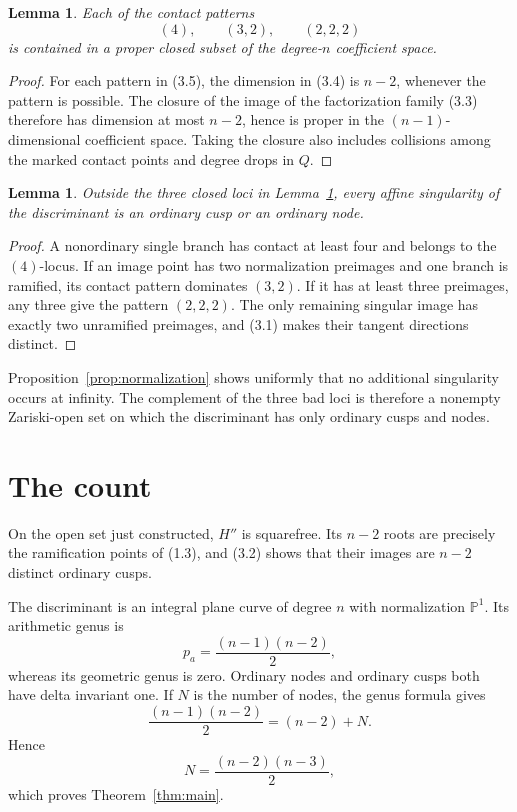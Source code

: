 \documentclass[11pt]{article}
\newtheorem{lemma}[theorem]{Lemma}
\newcommand{\Pone}{\mathbb P^1}
\begin{document}
\begin{lemma}\label{lem:bad}
Each of the contact patterns
\[
  (4),\qquad(3,2),\qquad(2,2,2)                          \tag{3.5}
\]
is contained in a proper closed subset of the degree-\(n\) coefficient
space.
\end{lemma}

\begin{proof}
For each pattern in (3.5), the dimension in (3.4) is \(n-2\), whenever the
pattern is possible.  The closure of the image of the factorization family
(3.3) therefore has dimension at most \(n-2\), hence is proper in the
\((n-1)\)-dimensional coefficient space.  Taking the closure also includes
collisions among the marked contact points and degree drops in \(Q\).
\end{proof}

\begin{lemma}\label{lem:exhaustion}
Outside the three closed loci in Lemma~\ref{lem:bad}, every affine
singularity of the discriminant is an ordinary cusp or an ordinary node.
\end{lemma}

\begin{proof}
A nonordinary single branch has contact at least four and belongs to the
\((4)\)-locus.  If an image point has two normalization preimages and one
branch is ramified, its contact pattern dominates \((3,2)\).  If it has at
least three preimages, any three give the pattern \((2,2,2)\).  The only
remaining singular image has exactly two unramified preimages, and (3.1)
makes their tangent directions distinct.
\end{proof}

Proposition~\ref{prop:normalization} shows uniformly that no additional
singularity occurs at infinity.  The complement of the three bad loci is
therefore a nonempty Zariski-open set on which the discriminant has only
ordinary cusps and nodes.

\section{The count}

On the open set just constructed, \(H''\) is squarefree.  Its \(n-2\) roots
are precisely the ramification points of (1.3), and (3.2) shows that their
images are \(n-2\) distinct ordinary cusps.

The discriminant is an integral plane curve of degree \(n\) with
normalization \(\Pone\).  Its arithmetic genus is
\[
  p_a=\frac{(n-1)(n-2)}2,
\]
whereas its geometric genus is zero.  Ordinary nodes and ordinary cusps
both have delta invariant one.  If \(N\) is the number of nodes, the genus
formula gives
\[
  \frac{(n-1)(n-2)}2=(n-2)+N.
\]
Hence
\[
  N=\frac{(n-2)(n-3)}2,
\]
which proves Theorem~\ref{thm:main}.
\end{document}
